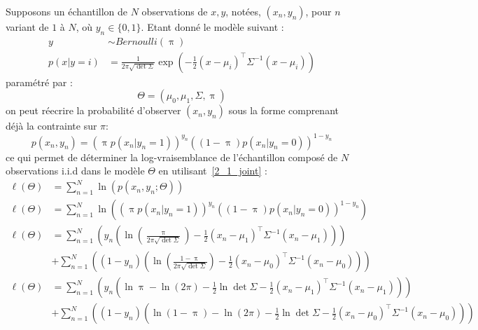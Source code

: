 \documentclass[12pt,a4paper,onecolumn]{article}
\begin{document}
Supposons un échantillon de \( N \) observations de \( x, y \), notées, \( (x_n, y_n) \), pour \( n \) variant de \( 1 \) à \( N \), où \(y_n \in \{0,1\} \). Etant donné le modèle suivant :
\begin{equation*}
	\begin{split}
		y &\sim Bernoulli(\uppi) \\
		p(x | y = i) &= \frac{1}{2\pi\sqrt{\det\Sigma}}\exp\left(-\frac{1}{2}(x - \mu_i)^\intercal\Sigma^{-1}(x - \mu_i)\right)
	\end{split}
\end{equation*}
paramétré par :
\[
	\Theta = (\mu_0, \mu_1, \Sigma, \uppi)
\]
on peut réecrire la probabilité d'observer \( (x_n, y_n )\) sous la forme comprenant déjà la contrainte sur \( \pi \):
\begin{equation}
	p(x_n, y_n) = \left(\uppi p(x_n | y_n = 1)\right)^{y_n} \left((1 - \uppi) p(x_n | y_n = 0)\right)^{1 - y_n}
	\label{2_1_joint}
\end{equation}
ce qui permet de déterminer la log-vraisemblance de l'échantillon composé de \( N \) observations i.i.d dans le modèle \( \Theta \) en utilisant~\eqref{2_1_joint} :
\begin{equation}
	\begin{split}
		\ell(\Theta) & =  \sum_{n = 1}^N \ln(p(x_n, y_n ; \Theta)) \\
		\ell(\Theta) & =  \sum_{n = 1}^N \ln\left(\left(\uppi p(x_n | y_n = 1)\right)^{y_n} \left((1 - \uppi) p(x_n | y_n = 0)\right)^{1 - y_n}\right) \\
		\ell(\Theta) & =  \sum_{n = 1}^N
		\left(y_n \left(\ln
			\left(\frac{\uppi}{2\pi\sqrt{\det\Sigma}}\right) -\frac{1}{2}(x_n - \mu_1)^\intercal\Sigma^{-1}(x_n - \mu_1) \right)\right)\\
		&+ 	\sum_{n = 1}^N\left((1 - y_n)
		\left(\ln
		\left(\frac{1 - \uppi}{2\pi\sqrt{\det\Sigma}}\right) -\frac{1}{2}(x_n - \mu_0)^\intercal\Sigma^{-1}(x_n - \mu_0) \right)\right) \\
		\ell(\Theta) & =  \sum_{n = 1}^N
		\left(y_n \left(\ln
			\uppi - \ln(2\pi) -\frac{1}{2}\ln\det\Sigma -\frac{1}{2}(x_n - \mu_1)^\intercal\Sigma^{-1}(x_n - \mu_1) \right)\right)\\
		&+ 	\sum_{n = 1}^N\left((1 - y_n)
		\left(\ln(1 - \uppi) - \ln(2\pi) -\frac{1}{2}\ln\det\Sigma -\frac{1}{2}(x_n - \mu_0)^\intercal\Sigma^{-1}(x_n - \mu_0) \right)\right)\\
	\end{split}
	\label{2_1_logl}
\end{equation}
\end{document}
